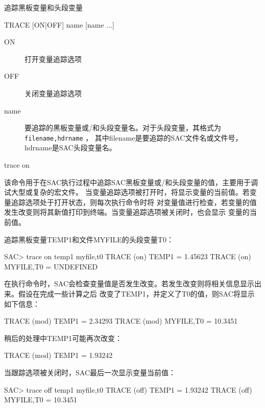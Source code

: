 \label{cmd:trace}

追踪黑板变量和头段变量

\begin{SACSTX}
TRACE [ON|OFF] name [name ...]
\end{SACSTX}

\begin{description}
\item [ON] 打开变量追踪选项
\item [OFF] 关闭变量追踪选项
\item [name] 要追踪的黑板变量或/和头段变量名。对于头段变量，其格式为\texttt{filename,hdrname} ，
    其中filename是要追踪的SAC文件名或文件号，hdrname是SAC头段变量名。
\end{description}

\begin{SACDFT}
trace on
\end{SACDFT}

该命令用于在SAC执行过程中追踪SAC黑板变量或/和头段变量的值，主要用于调试大型或复杂的宏文件。
当变量追踪选项被打开时，将显示变量的当前值。若变量追踪选项处于打开状态，则每次执行命令时将
对变量值进行检查，若变量的值发生改变则将其新值打印到终端。当变量追踪选项被关闭时，也会显示
变量的当前值。

追踪黑板变量TEMP1和文件MYFILE的头段变量T0：
\begin{SACCode}
SAC> trace on temp1 myfile,t0
  TRACE  (on) TEMP1 = 1.45623
  TRACE  (on) MYFILE,T0 = UNDEFINED
\end{SACCode}

在执行命令时，SAC会检查变量值是否发生改变。若发生改变则将相关信息显示出来。假设在完成一些计算之后
改变了TEMP1，并定义了T0的值，则SAC将显示如下信息：
\begin{SACCode}
  TRACE (mod) TEMP1 = 2.34293
  TRACE (mod) MYFILE,T0 = 10.3451
\end{SACCode}

稍后的处理中TEMP1可能再次改变：
\begin{SACCode}
  TRACE (mod) TEMP1 = 1.93242
\end{SACCode}

当跟踪选项被关闭时，SAC最后一次显示变量当前值：
\begin{SACCode}
SAC> trace off temp1 myfile,t0
  TRACE (off) TEMP1 = 1.93242
  TRACE (off) MYFILE,T0 = 10.3451
\end{SACCode}
